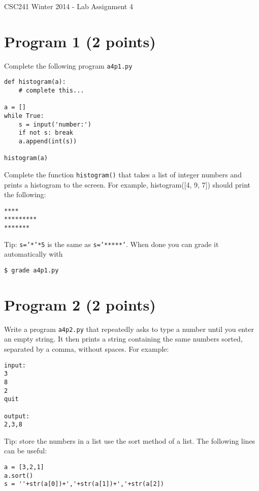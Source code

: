 \documentclass[12pt]{article}
\begin{document}
{\Large CSC241 Winter 2014 - Lab Assignment 4}

\section{Program 1 (2 points)}

\noindent
Complete the following program {\tt a4p1.py}
\begin{verbatim}
def histogram(a):
    # complete this...

a = []
while True:
    s = input('number:')
    if not s: break
    a.append(int(s))

histogram(a)     
\end{verbatim}
Complete the function {\tt histogram()} 
that takes a list of integer numbers and                      
prints a histogram to the screen. For example, histogram([4, 9, 7])                          
should print the following:                                                                  
\begin{verbatim}
****                                                                                         
*********                                                                                    
*******
\end{verbatim}

Tip: {\tt s='*'*5} is the same as {\tt s='*****'}.
\noindent When done you can grade it automatically with
\begin{verbatim}
$ grade a4p1.py
\end{verbatim}


\section{Program 2 (2 points)}

\noindent
Write a program {\tt a4p2.py} 
that repeatedly asks to type a number until you enter an empty string.                   
It then prints a string containing the same numbers sorted, separated by a comma,             
without spaces. 
For example:

\begin{verbatim}
input: 
3
8
2
quit

output:
2,3,8
\end{verbatim}

Tip: store the numbers in a list use the sort method of a list.
The following lines can be useful:
\begin{verbatim}
a = [3,2,1]
a.sort()
s = ''+str(a[0])+','+str(a[1])+','+str(a[2])
\end{verbatim}
\end{document}
